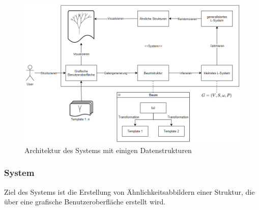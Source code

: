 \begin{figure}[H]
    \centering
    \includegraphics[width=14cm]{../images/System.PNG}
    \caption[Systemarchitektur]{Architektur des Systems mit einigen Datenstrukturen}
\end{figure}

\subsubsection{System}
Ziel des Systems ist die Erstellung von Ähnlichkeitsabbildern einer Struktur, die über eine grafische
Benutzeroberfläche erstellt wird.